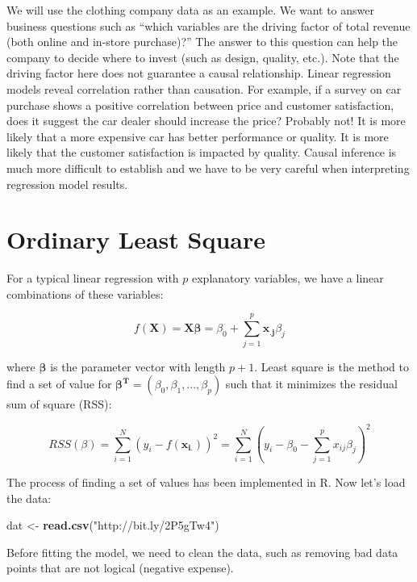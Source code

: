 \documentclass[12pt,]{krantz}
\makeatletter
\newenvironment{Shaded}{\begin{snugshade}}{\end{snugshade}}
\newcommand{\KeywordTok}[1]{\textcolor[rgb]{0.27,0.27,0.27}{\textbf{#1}}}
\newcommand{\NormalTok}[1]{#1}
\newcommand{\StringTok}[1]{\textcolor[rgb]{0.5,0.5,0.5}{#1}}
\newenvironment{kframe}{%
\medskip{}
\setlength{\fboxsep}{.8em}
 \def\at@end@of@kframe{}%
 \ifinner\ifhmode%
  \def\at@end@of@kframe{\end{minipage}}%
  \begin{minipage}{\columnwidth}%
 \fi\fi%
 \def\FrameCommand##1{\hskip\@totalleftmargin \hskip-\fboxsep
 \colorbox{shadecolor}{##1}\hskip-\fboxsep
     \hskip-\linewidth \hskip-\@totalleftmargin \hskip\columnwidth}%
 \MakeFramed {\advance\hsize-\width
   \@totalleftmargin\z@ \linewidth\hsize
   \@setminipage}}%
 {\par\unskip\endMakeFramed%
 \at@end@of@kframe}
\renewenvironment{Shaded}{\begin{kframe}}{\end{kframe}}
\makeatother
\begin{document}
We will use the clothing company data as an example. We want to answer business questions such as ``which variables are the driving factor of total revenue (both online and in-store purchase)?'' The answer to this question can help the company to decide where to invest (such as design, quality, etc.). Note that the driving factor here does not guarantee a causal relationship. Linear regression models reveal correlation rather than causation. For example, if a survey on car purchase shows a positive correlation between price and customer satisfaction, does it suggest the car dealer should increase the price? Probably not! It is more likely that a more expensive car has better performance or quality. It is more likely that the customer satisfaction is impacted by quality. Causal inference is much more difficult to establish and we have to be very careful when interpreting regression model results.

\hypertarget{ordinary-least-square}{%
\section{Ordinary Least Square}\label{ordinary-least-square}}

For a typical linear regression with \(p\) explanatory variables, we have a linear combinations of these variables:

\[f(\mathbf{X})=\mathbf{X}\mathbf{\beta}=\beta_{0}+\sum_{j=1}^{p}\mathbf{x_{.j}}\beta_{j}\]

where \(\mathbf{\beta}\) is the parameter vector with length \(p+1\). Least square is the method to find a set of value for \(\mathbf{\beta^{T}}=(\beta_{0},\beta_{1},...,\beta_{p})\) such that it minimizes the residual sum of square (RSS):

\[RSS(\beta)=\sum_{i=1}^{N}(y_{i}-f(\mathbf{x_{i.}}))^{2}=\sum_{i=1}^{N}(y_{i}-\beta_{0}-\sum_{j=1}^{p}x_{ij}\beta_{j})^{2}\]

The process of finding a set of values has been implemented in R. Now let's load the data:

\begin{Shaded}
\begin{Highlighting}[]
\NormalTok{dat <-}\StringTok{ }\KeywordTok{read.csv}\NormalTok{(}\StringTok{"http://bit.ly/2P5gTw4"}\NormalTok{)}
\end{Highlighting}
\end{Shaded}

Before fitting the model, we need to clean the data, such as removing bad data points that are not logical (negative expense).
\end{document}

